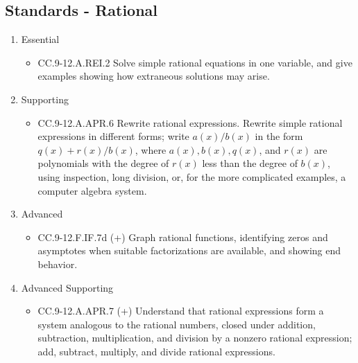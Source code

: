 \documentclass{article}
\begin{document}
\subsection*{Standards - Rational}
\begin{enumerate}
	\item Essential
	\begin{itemize}
		\item CC.9-12.A.REI.2 Solve simple rational equations in one variable, and give examples showing how extraneous solutions may arise.
	\end{itemize}		
	\item Supporting
	\begin{itemize}
		\item CC.9-12.A.APR.6 Rewrite rational expressions. Rewrite simple rational expressions in different forms; write $a(x)/b(x)$ in the form $q(x) + r(x)/b(x)$, where $a(x), b(x), q(x)$, and $r(x)$ are polynomials with the degree of $r(x)$ less than the degree of $b(x)$, using inspection, long division, or, for the more complicated examples, a computer algebra system.
	\end{itemize}
	\item Advanced
	\begin{itemize}
		\item CC.9-12.F.IF.7d (+) Graph rational functions, identifying zeros and asymptotes when suitable factorizations are available, and showing end behavior. 
	\end{itemize}
	\item Advanced Supporting
	\begin{itemize}
		\item CC.9-12.A.APR.7 (+)  Understand that rational expressions form a system analogous to the rational numbers, closed under addition, subtraction, multiplication, and division by a nonzero rational expression; add, subtract, multiply, and divide rational expressions.
	\end{itemize}
\end{enumerate}
\newpage
\end{document}
